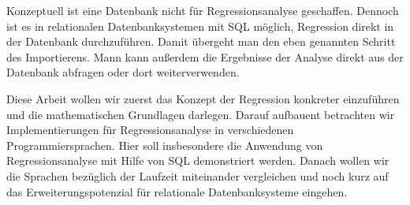Konzeptuell ist eine Datenbank nicht für Regressionsanalyse geschaffen. Dennoch ist es in relationalen Datenbanksystemen mit SQL möglich, Regression direkt in der Datenbank durchzuführen. Damit übergeht man den eben genannten Schritt des Importierens. Mann kann außerdem die Ergebnisse der Analyse direkt aus der Datenbank abfragen oder dort weiterverwenden.

Diese Arbeit wollen wir zuerst das Konzept der Regression konkreter einzuführen und die mathematischen Grundlagen darlegen. Darauf aufbauent betrachten wir Implementierungen für Regressionsanalyse in verschiedenen Programmiersprachen. Hier soll insbesondere die Anwendung von Regressionsanalyse mit Hilfe von SQL demonstriert werden. Danach wollen wir die Sprachen bezüglich der Laufzeit miteinander vergleichen und noch kurz auf das Erweiterungspotenzial für relationale Datenbanksysteme eingehen.
